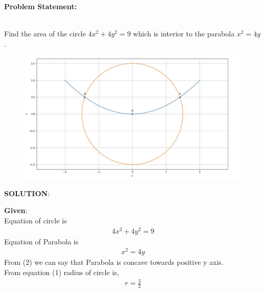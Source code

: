 \documentclass[10pt,a4paper]{report}
\begin{document}
\begin{multicols}{2}

\raggedright \textbf{Problem Statement:}\vspace{2mm}
\raggedright \\ 
\fi
	Find the area of the circle $4x^2+4y^2=9$ which is interior to the parabola $x^2=4y$.\\
	\solution
	\begin{figure}[!h]
		\centering
 \includegraphics[width=\columnwidth]{chapters/12/8/2/1/figs/conic.jpg}
		\caption{}
		\label{fig:12/8/2/1}
  	\end{figure}
	\iffalse
\vspace{5mm}
\raggedright \textbf{SOLUTION}:\vspace{2mm}\\

\raggedright \textbf{Given}:\vspace{2mm}\\
Equation of circle is \\
\begin{align}
4x^2+4y^2=9
\end{align}
Equation of Parabola is \\ 
\begin{align}
x^2=4y 
\end{align}
From (2) we can say that Parabola is concave towards positive y axis.\\ \vspace{2mm}
From equation (1) radius of circle is,\\ 
\begin{align}
r= \frac{3}{2}
\end{align}


\end{multicols}
\end{document}
